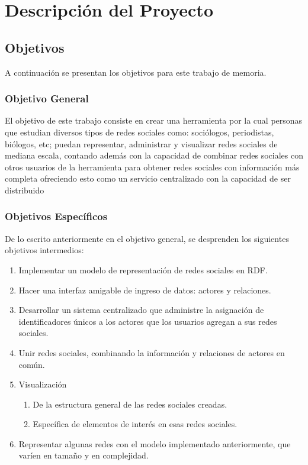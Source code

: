 \chapter{Descripción del Proyecto}

\section{Objetivos} %
\label{sec:objetivos}
A continuación se presentan los objetivos para este trabajo de memoria.

\subsection{Objetivo General} %
\label{sub:objetivo_general}

El objetivo de este trabajo consiste en crear una herramienta por la cual personas que estudian diversos tipos de redes
sociales como: sociólogos, periodistas, biólogos, etc; puedan representar, administrar y visualizar redes sociales
de mediana escala, contando además con la capacidad de combinar redes sociales con otros usuarios de la herramienta
para obtener redes sociales con información más completa ofreciendo esto como un servicio centralizado con la
capacidad de ser distribuido


\subsection{Objetivos Específicos} %
\label{sub:objetivos_especificos}

De lo escrito anteriormente en el objetivo general, se desprenden los siguientes objetivos intermedios:

  \begin{enumerate}
    \item Implementar un modelo de representación de redes sociales en RDF.
    \item Hacer una interfaz amigable de ingreso de datos: actores y relaciones.
    \item Desarrollar un sistema centralizado que administre la asignación de identificadores únicos a los actores que los usuarios agregan a sus redes sociales.
    \item Unir redes sociales, combinando la información y relaciones de actores en común.
    \item Visualización
      \begin{enumerate}
        \item De la estructura general de las redes sociales creadas.
        \item Específica de elementos de interés en esas redes sociales.
      \end{enumerate}
    \item Representar algunas redes con el modelo implementado anteriormente, que varíen en tamaño y en complejidad.
  \end{enumerate}

